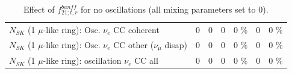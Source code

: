 \begin{table}
\begin{tabular}{| l | r | r | r  r | r  r |}
                          $N_{SK}$ (1 $\mu$-like ring): Osc. $\nu_e$ CC coherent &               0 &               0 &               0 &        0 \%  &               0 &        0 \%  \\ 
           $N_{SK}$ (1 $\mu$-like ring): Osc. $\nu_e$ CC other ($\nu_\mu$ disap) &               0 &               0 &               0 &        0 \%  &               0 &        0 \%  \\ 
                        $N_{SK}$ (1 $\mu$-like ring): oscillation $\nu_e$ CC all &               0 &               0 &               0 &        0 \%  &               0 &        0 \%  \\ 
\hline
\hline
\end{tabular}
\caption{ Effect of $f_{21; t, r}^{banff}$ for no oscillations (all mixing parameters set to 0). }
\label{tab:num_banff_cc1piE0_1RmuT_3f_osc_t13:0}
\end{table}
\clearpage
